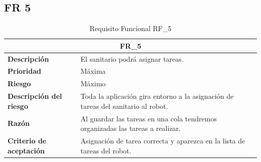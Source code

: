 \documentclass{scrreprt}
\begin{document}
\subsection{FR 5}
\begin{table}[H]

    \label{tab:my-table}
    
    \begin{tabular}{|p{5cm}|p{11cm}|}
    \hline
    \multicolumn{2}{|c|}{\textbf{FR_5}} \\
    \hline
    \textbf{Descripción  }                      &  El sanitario podrá asignar tareas.                                                                           \\ \hline
    \textbf{Prioridad}                          & Máxima                                                                                              \\ \hline
    \textbf{Riesgo}                          & Máximo                                                                                                \\ \hline
    \textbf{Descripción del riesgo}                    & Toda la aplicación gira entorno a la asignación de tareas del sanitario al robot.                                                                          \\ \hline
    \textbf{Razón}                   & Al guardar las tareas en una cola tendremos organizadas las tareas a realizar.                                                                                              \\ \hline
    \textbf{Criterio de aceptación}                    & Asignación de tarea correcta y aparezca en la lista de tareas del robot.  \\ \hline
    \end{tabular}%
    
    \caption{Requisito Funcional RF_5}
\end{table}
\end{document}
